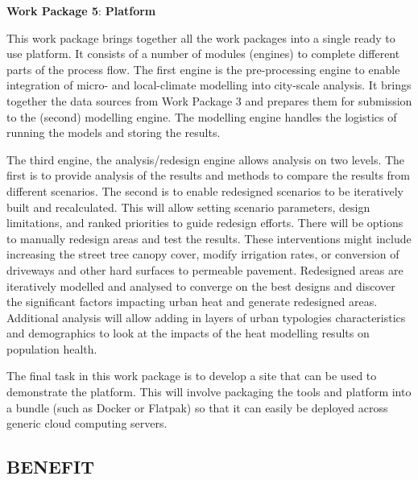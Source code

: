 \textbf{Work Package 5}: \textbf{Platform} \emph{  }

This work package brings together all the work packages into a single ready to use platform. It consists of a number of modules (engines) to complete different parts of the process flow. The first engine is the pre-processing engine to enable integration of micro- and local-climate modelling into city-scale analysis. It brings together the data sources from Work Package 3 and prepares them for submission to the (second) modelling engine. The modelling engine handles the logistics of running the models and storing the results. 

The third engine, the analysis/redesign engine allows analysis on two levels. The first is to provide analysis of the results and methods to compare the results from different scenarios. The second is to enable redesigned scenarios to be iteratively built and recalculated. This will allow setting scenario parameters, design limitations, and ranked priorities to guide redesign efforts. There will be options to manually redesign areas and test the results. These interventions might include increasing the street tree canopy cover, modify irrigation rates, or  conversion of driveways and other hard surfaces to permeable pavement. Redesigned areas are iteratively modelled and analysed to converge on the best designs and discover the significant factors impacting urban heat and generate redesigned areas. Additional analysis will allow adding in layers of urban typologies characteristics and demographics to look at the impacts of the heat modelling results on population health.
 
The final task in this work package is to develop a site that can be used to demonstrate the platform. This will involve packaging the tools and platform into a bundle (such as Docker or Flatpak) so that it can easily be deployed across generic cloud computing servers.







\subsection*{\TitleFont BENEFIT}



